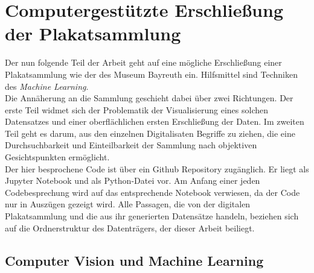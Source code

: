 \documentclass[a4paper,12pt,ngerman]{article}
\begin{document}
\section{Computergestützte Erschließung der Plakatsammlung}
Der nun folgende Teil der Arbeit geht auf eine mögliche Erschließung einer Plakatsammlung wie der des Museum Bayreuth ein. Hilfsmittel sind Techniken des \textit{Machine Learning}. \\
Die Annäherung an die Sammlung geschieht dabei über zwei Richtungen. Der erste Teil widmet sich der Problematik der Visualisierung eines solchen Datensatzes und einer oberflächlichen ersten Erschließung der Daten. Im zweiten Teil geht es darum, aus den einzelnen Digitalisaten Begriffe zu ziehen, die eine Durchsuchbarkeit und Einteilbarkeit der Sammlung nach objektiven Gesichtspunkten ermöglicht. \\
Der hier besprochene Code ist über ein Github Repository zugänglich. Er liegt als Jupyter Notebook und als Python-Datei vor. Am Anfang einer jeden Codebesprechung wird auf das entsprechende Notebook verwiesen, da der Code nur in Auszügen gezeigt wird. Alle Passagen, die von der digitalen Plakatsammlung und die aus ihr generierten Datensätze handeln, beziehen sich auf die Ordnerstruktur des Datenträgers, der dieser Arbeit beiliegt. \\

\subsection{Computer Vision und Machine Learning}
\end{document}
